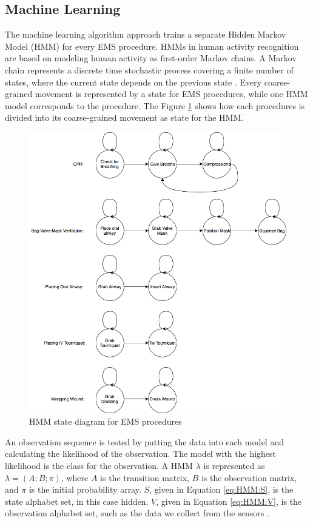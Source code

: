 \subsection{Machine Learning}
\label{sec:Approach:Machine-Learning}
The machine learning algorithm approach trains a separate Hidden Markov Model (HMM) for every EMS procedure. HMMs in human activity recognition are based on modeling human activity as first-order Markov chains. A Markov chain represents a discrete time stochastic process covering a finite number of states, where the current state depends on the previous state \cite{Faicel2013}. Every coarse-grained movement is represented by a state for EMS procedures, while one HMM model corresponds to the procedure. The Figure \ref{fig:HMM} shows how each procedures is divided into its coarse-grained movement as state for the HMM.
\begin{figure}
	\centering
	\includegraphics[width=0.7\linewidth]{pictures/HMM}
	\caption{HMM state diagram for EMS procedures}
	\label{fig:HMM}
\end{figure}
An observation sequence is tested by putting the data into each model and calculating the likelihood of the observation. The model with the highest likelihood is the class for the observation. A HMM $\lambda$ is represented as $\lambda = (A; B; \pi)$, where $A$ is the transition matrix, $B$ is the observation matrix, and $\pi$ is the initial probability array. $S$, given in Equation \ref{eq:HMM:S}, is the state alphabet set, in this case hidden. $V$, given in Equation \ref{eq:HMM:V}, is the observation alphabet set, such as the data we collect from the sensors \cite{Cheng2017}.
